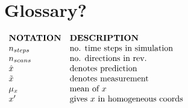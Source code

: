 \chapter*{Glossary?}

$
\begin{array}{ll}
	\textbf{NOTATION} 	& \textbf{DESCRIPTION}\\
	n_{steps}			& \textnormal{no. time steps in simulation}\\
	n_{scans}			& \textnormal{no. directions in rev.}\\
	\hat{x}	 			& \textnormal{denotes prediction}\\
	\tilde{x}	 		& \textnormal{denotes measurement}\\
	\mu_x		 		& \textnormal{mean of } x\\
	x'					& \textnormal{gives } x \textnormal{ in homogeneous coords}
\end{array}
$